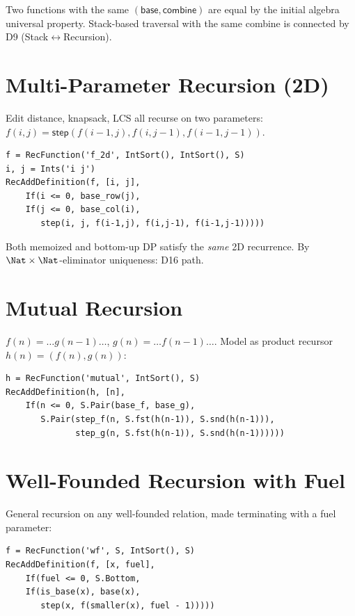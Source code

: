 \begin{theorem}
Two functions with the same $(\mathsf{base}, \mathsf{combine})$ are
equal by the initial algebra universal property.  Stack-based traversal
with the same combine is connected by D9 (Stack$\leftrightarrow$Recursion).
\end{theorem}

\section{Multi-Parameter Recursion (2D)}

Edit distance, knapsack, LCS all recurse on two parameters:
$f(i,j) = \mathsf{step}(f(i{-}1,j), f(i,j{-}1), f(i{-}1,j{-}1))$.

\begin{lstlisting}[caption={2D RecFunction}]
f = RecFunction('f_2d', IntSort(), IntSort(), S)
i, j = Ints('i j')
RecAddDefinition(f, [i, j],
    If(i <= 0, base_row(j),
    If(j <= 0, base_col(i),
       step(i, j, f(i-1,j), f(i,j-1), f(i-1,j-1)))))
\end{lstlisting}

Both memoized and bottom-up DP satisfy the \emph{same} 2D recurrence.
By $\Nat \times \Nat$-eliminator uniqueness: D16 path.

\section{Mutual Recursion}

$f(n) = \ldots g(n{-}1)\ldots$, $g(n) = \ldots f(n{-}1)\ldots$.
Model as product recursor $h(n) = (f(n), g(n))$:

\begin{lstlisting}[caption={Mutual recursion as product}]
h = RecFunction('mutual', IntSort(), S)
RecAddDefinition(h, [n],
    If(n <= 0, S.Pair(base_f, base_g),
       S.Pair(step_f(n, S.fst(h(n-1)), S.snd(h(n-1))),
              step_g(n, S.fst(h(n-1)), S.snd(h(n-1))))))
\end{lstlisting}

\section{Well-Founded Recursion with Fuel}

General recursion on any well-founded relation, made terminating
with a fuel parameter:

\begin{lstlisting}[caption={Well-founded recursion}]
f = RecFunction('wf', S, IntSort(), S)
RecAddDefinition(f, [x, fuel],
    If(fuel <= 0, S.Bottom,
    If(is_base(x), base(x),
       step(x, f(smaller(x), fuel - 1)))))
\end{lstlisting}

